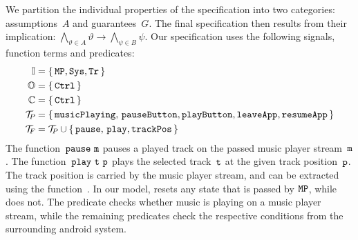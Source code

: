 We partition the individual properties of the specification into two
categories: assumptions~$ A $ and guarantees~$ G $. The final
specification then results from their implication:
$ \bigwedge_{\vartheta \in A} \vartheta \rightarrow \bigwedge_{\psi
  \in B} \psi $. Our specification uses the following signals,
function terms and predicates:
%
\begin{align*}
  \mathbb{I} &= \{\, {\text{\texttt{MP}}}, {\text{\texttt{Sys}}},  {\text{\texttt{Tr}}}\,\} \\
  \mathbb{O} &= \{\, {\text{\texttt{Ctrl}}} \,\} \\
  \mathbb{C}  &= \{\, {\text{\texttt{Ctrl}}} \,\} \\
  \mathcal{T}_{\!P\hspace{-0.5pt}} &= \{\, {\text{\texttt{musicPlaying}}},\, {\text{\texttt{pauseButton}}},{\text{\texttt{playButton}}}, {\text{\texttt{leaveApp}}}, {\text{\texttt{resumeApp}}} \,\} \\
  \mathcal{T}_{\!F\hspace{-0.5pt}} &= \mathcal{T}_{\!P\hspace{-0.5pt}} \cup \{\, {\text{\texttt{pause}}},\, {\text{\texttt{play}}},{\text{\texttt{trackPos}}} \,\} \\
\end{align*}
%
The function~$ {\text{\texttt{pause}}}~{\text{\texttt{m}}} $ pauses a played track on the passed music player stream~$ {\text{\texttt{m}}} $. The function~${\text{\texttt{play}}}~{\text{\texttt{t}}}~{\text{\texttt{p}}} $ plays the selected track~$ {\text{\texttt{t}}} $ at the given track position~$ {\text{\texttt{p}}} $. The track position is carried by the music player stream, and can be extracted using the function~. In our model,  resets any state that is passed by $ {\text{\texttt{MP}}} $, while  does not. The predicate  checks whether music is playing on a music player stream, while the remaining predicates check the respective conditions from the surrounding android system.

